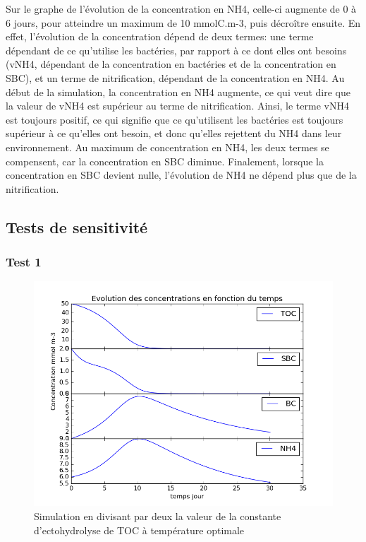 \par{
Sur le graphe de l'\'evolution de la concentration en NH4, celle-ci augmente de 0 \`a 6 jours, pour atteindre un maximum de 10 mmolC.m-3, puis d\'ecro\^itre ensuite. En effet, l'\'evolution de la concentration d\'epend de deux termes: une terme d\'ependant de ce qu'utilise les bact\'eries, par rapport \`a ce dont elles ont besoins (vNH4, d\'ependant de la concentration en bact\'eries et de la concentration en SBC), et un terme de nitrification, d\'ependant de la concentration en NH4. Au d\'ebut de la simulation, la concentration en NH4 augmente, ce qui veut dire que la valeur de vNH4 est sup\'erieur au terme de nitrification. Ainsi, le terme vNH4 est toujours positif, ce qui signifie que ce qu'utilisent les bact\'eries est toujours sup\'erieur \`a ce qu'elles ont besoin, et donc qu'elles rejettent du NH4 dans leur environnement. Au maximum de concentration en NH4, les deux termes se compensent, car la concentration en SBC diminue. Finalement, lorsque la concentration en SBC devient nulle, l'\'evolution de NH4 ne d\'epend plus que de la nitrification.
}

\subsection{Tests de sensitivit\'e}
\subsubsection{Test 1}

\begin{figure}[h!]
  \includegraphics[width=\textwidth]{partie1/Test1.png}
  \caption{Simulation en divisant par deux la valeur de la constante d'ectohydrolyse de TOC \`a temp\'erature optimale
  }
  \label{fig:partie1test1}
\end{figure}



